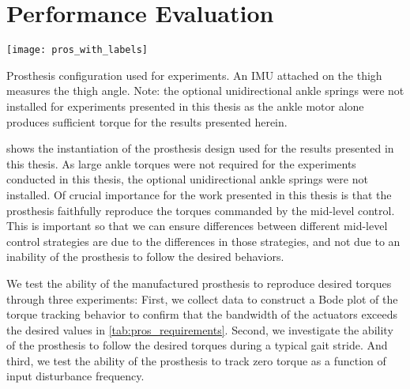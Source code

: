 \section{Performance Evaluation}\label{sec:pros_perf_eval}

\begin{marginfigure}[-1in]
\centerline{\texttt{[image: pros\_with\_labels]}}
\caption[Prosthesis configuration used for experiments]{Prosthesis configuration
used for experiments. An IMU attached on the thigh measures the thigh angle.
Note: the optional unidirectional ankle springs were not installed for
experiments presented in this thesis as the ankle motor alone produces
sufficient torque for the results presented
herein.}\label{fig:prosthesis_actual}
\end{marginfigure}

 shows the instantiation of the prosthesis design
used for the results presented in this thesis. As large ankle torques were not
required for the experiments conducted in this thesis, the optional
unidirectional ankle springs were not installed. Of crucial importance for the
work presented in this thesis is that the prosthesis faithfully reproduce the
torques commanded by the mid-level control. This is important so that we can
ensure differences between different mid-level control strategies are due to
the differences in those strategies, and not due to an inability of the
prosthesis to follow the desired behaviors.

We test the ability of the manufactured prosthesis to reproduce desired torques
through three experiments: First, we collect data to construct a Bode plot of
the torque tracking behavior to confirm that the bandwidth of the actuators
exceeds the desired values in \cref{tab:pros_requirements}. Second, we
investigate the ability of the prosthesis to follow the desired torques during a
typical gait stride. And third, we test the ability of the prosthesis to track
zero torque as a function of input disturbance frequency.

